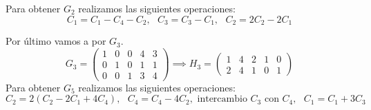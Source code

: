 \begin{problem}[16]
Para obtener $G_2$ realizamos las siguientes operaciones:
\[C_1 = C_1-C_4-C_2, \text{ } C_3=C_3-C_1, \text{ } C_2=2C_2-2C_1\]

Por último vamos a por $G_3$.
\[G_3=\left(\begin{array}{ccccc}
1 & 0 & 0 & 4 & 3 \\
0 & 1 & 0 & 1 & 1 \\
0 & 0 & 1 & 3 & 4
\end{array}\right) \implies H_3=\left(\begin{array}{ccccc}
1 & 4 & 2 & 1 & 0 \\
2 & 4 & 1 & 0 & 1
\end{array}\right)\]
Para obtener $G_5$ realizamos las siguientes operaciones:
\[C_2 = 2(C_2-2C_1+4C_4), \text{ } C_4 = C_4-4C_2, \text{ intercambio }C_3 \text{ con }C_4, \text{ } C_1=C_1+3C_3\]
\end{problem}


